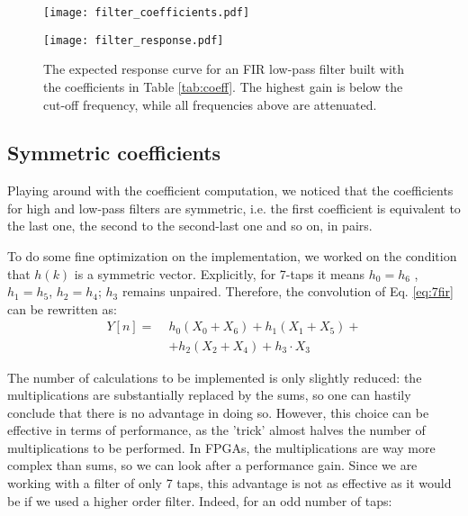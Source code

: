 \begin{figure}[H]
    \centering
    \texttt{[image: filter\_coefficients.pdf]}
    \qquad
\end{figure}

\begin{figure}[H]
    \centering
    \label{fig:response_curve}
    \caption{The expected response curve for an FIR low-pass filter built with the coefficients in Table \ref{tab:coeff}. The highest gain is below the cut-off frequency, while all frequencies above are attenuated. }
    \texttt{[image: filter\_response.pdf]}
    \qquad
\end{figure}




\subsection{Symmetric coefficients}
\label{ssec:symmetric_coefficients}

Playing around with the coefficient computation, we noticed that the coefficients for high and low-pass filters are symmetric, i.e. the first coefficient is equivalent to the last one, the second to the second-last one and so on, in pairs. 

To do some fine optimization on the implementation, we worked on the condition that $h(k)$ is a symmetric vector. Explicitly, for 7-taps it means $h_0=h_6$ , $h_1=h_5$, $h_2=h_4$; $h_3$ remains unpaired. Therefore, the convolution of Eq. \ref{eq:7fir} can be rewritten as:
\begin{equation}
\begin{split}
    Y[n] = \; & h_0 (X_0+X_6) + h_1(X_1+X_5) + \\ 
           & + h_2(X_2+X_4) + h_3 \cdot X_3
\end{split}
\label{eq:7fir_optimized}
\end{equation}

The number of calculations to be implemented is only slightly reduced: the multiplications are substantially replaced by the sums, so one can hastily conclude that there is no advantage in doing so. However, this choice can be effective in terms of performance, as the 'trick' almost halves the number of multiplications to be performed. In FPGAs, the multiplications are way more complex than sums, so we can look after a performance gain. Since we are working with a filter of only 7 taps, this advantage is not as effective as it would be if we used a higher order filter. Indeed, for an odd number of taps:

